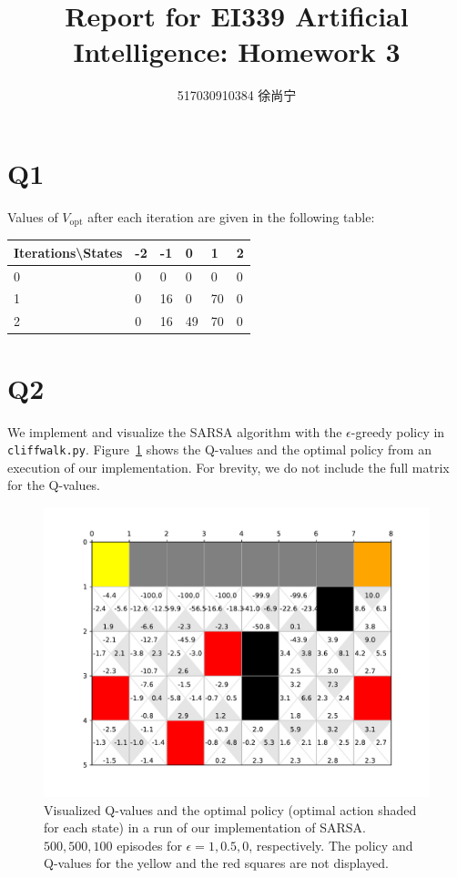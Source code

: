 \documentclass[a4paper]{article}
\title{Report for EI339 Artificial Intelligence: Homework 3}
\author{517030910384 徐尚宁}
\date{}
\begin{document}
\begin{CJK}{UTF8}{gbsn}
    \maketitle
\end{CJK}

\section*{Q1}

Values of $V_\textrm{opt}$ after each iteration are given in the following table:

\begin{table}[h]
    \begin{tabular}{|l|l|l|l|l|l|}
    \hline
    Iterations\textbackslash States & -2 & -1 & 0 & 1 & 2 \\ \hline
    0 & 0 & 0 & 0 & 0 & 0 \\ \hline
    1 & 0 & 16 & 0 & 70 & 0 \\ \hline
    2 & 0 & 16 & 49 & 70 & 0 \\ \hline
    \end{tabular}
\end{table}

\section*{Q2}

We implement and visualize the SARSA algorithm with the $\epsilon$-greedy policy
in \texttt{cliffwalk.py}. Figure~\ref{fig:an-execution-of-sarsa-algorithm} shows
the Q-values and the optimal policy from an execution of our implementation. For
brevity, we do not include the full matrix for the Q-values.

\begin{figure}[ht]
    \centering
    \includegraphics[width=\linewidth]{q_values_and_policy.pdf}
    \caption{Visualized Q-values and the optimal policy (optimal action shaded
    for each state) in a run of our implementation of SARSA. $500, 500, 100$
    episodes for $\epsilon = 1, 0.5, 0$, respectively. The policy and Q-values
    for the yellow and the red squares are not displayed.}
    \label{fig:an-execution-of-sarsa-algorithm}
\end{figure}
\end{document}
